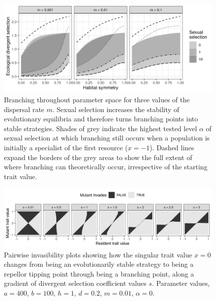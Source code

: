 
\begin{figure}
    \centering
    \includegraphics[width=\textwidth]{figures/map_branching_points}
    \caption{Branching throughout parameter space for three values of the dispersal rate $m$. Sexual selection increases the stability of evolutionary equilibria and therefore turns branching points into stable strategies. Shades of grey indicate the highest tested level $\alpha$ of sexual selection at which branching still occurs when a population is initially a specialist of the first resource ($x = -1$). Dashed lines expand the borders of the grey areas to show the full extent of where branching can theoretically occur, irrespective of the starting trait value.}
    \label{fig:map_branching_points}
\end{figure}

\begin{figure}
    \centering
    \includegraphics[width=\textwidth]{figures/pairwise_invasibility_plots}
    \caption{Pairwise invasibility plots showing how the singular trait value $x = 0$ changes from being an evolutionarily stable strategy to being a repellor tipping point through being a branching point, along a gradient of divergent selection coefficient values $s$. Parameter values, $a = 400$, $b = 100$, $h = 1$, $d = 0.2$, $m = 0.01$, $\alpha = 0$.}
    \label{fig:pairwise_invasibility}
\end{figure}

